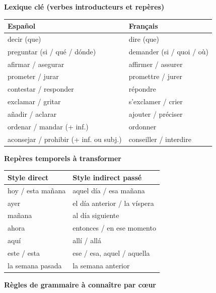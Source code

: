 \documentclass[11pt]{article}
\begin{document}
\begin{bilan}
\textbf{Lexique clé (verbes introducteurs et repères)}

\begin{center}
\begin{tabularx}{\linewidth}{|X|X|}\hline
\rowcolor{popblueL} \textbf{Español} & \textbf{Français} \\ \hline
decir (que) & dire (que) \\ \hline
preguntar (si / qué / dónde) & demander (si / quoi / où) \\ \hline
afirmar / asegurar & affirmer / assurer \\ \hline
prometer / jurar & promettre / jurer \\ \hline
contestar / responder & répondre \\ \hline
exclamar / gritar & s'exclamer / crier \\ \hline
añadir / aclarar & ajouter / préciser \\ \hline
ordenar / mandar (+ inf.) & ordonner \\ \hline
aconsejar / prohibir (+ inf. ou subj.) & conseiller / interdire \\ \hline
\end{tabularx}
\end{center}

\textbf{Repères temporels à transformer}

\begin{center}
\begin{tabularx}{\linewidth}{|X|X|}\hline
\rowcolor{popblueL} \textbf{Style direct} & \textbf{Style indirect passé} \\ \hline
hoy / esta mañana & aquel día / esa mañana \\ \hline
ayer & el día anterior / la víspera \\ \hline
mañana & al día siguiente \\ \hline
ahora & entonces / en ese momento \\ \hline
aquí & allí / allá \\ \hline
este / esta & ese / esa, aquel / aquella \\ \hline
la semana pasada & la semana anterior \\ \hline
\end{tabularx}
\end{center}

\textbf{Règles de grammaire à connaître par cœur}


\end{bilan}
\end{document}
